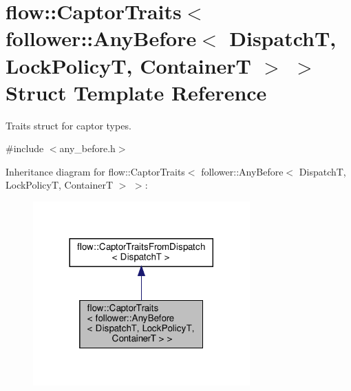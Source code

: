 \hypertarget{structflow_1_1_captor_traits_3_01follower_1_1_any_before_3_01_dispatch_t_00_01_lock_policy_t_00_01_container_t_01_4_01_4}{}\section{flow\+:\+:Captor\+Traits$<$ follower\+:\+:Any\+Before$<$ DispatchT, Lock\+PolicyT, ContainerT $>$ $>$ Struct Template Reference}
\label{structflow_1_1_captor_traits_3_01follower_1_1_any_before_3_01_dispatch_t_00_01_lock_policy_t_00_01_container_t_01_4_01_4}


Traits struct for captor types.  




{\ttfamily \#include $<$any\+\_\+before.\+h$>$}



Inheritance diagram for flow\+:\+:Captor\+Traits$<$ follower\+:\+:Any\+Before$<$ DispatchT, Lock\+PolicyT, ContainerT $>$ $>$\+:\nopagebreak
\begin{figure}[H]
\begin{center}
\leavevmode
\includegraphics[width=236pt]{structflow_1_1_captor_traits_3_01follower_1_1_any_before_3_01_dispatch_t_00_01_lock_policy_t_00_ae3a1d83bc298c4eeaed76582652fe69}
\end{center}
\end{figure}


